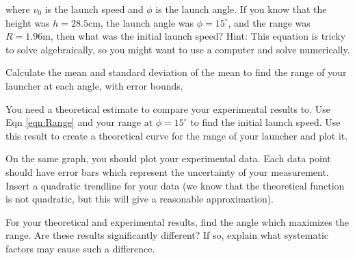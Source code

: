where $v_0$ is the launch speed and $\phi$ is the launch angle.  If you know that the height was $h=28.5$cm, the launch angle was $\phi=15^\circ$, and the range was $R=1.96$m, then what was the initial launch speed? Hint: This equation is tricky to solve algebraically, so you might want to use a computer and solve numerically.

\analysis

Calculate the mean and standard deviation of the mean to find the range of your launcher at each angle, with error bounds.

You need a theoretical estimate to compare your experimental results to. Use Eqn \ref{eqn:Range} and your range at $\phi=15^\circ$ to find the initial launch speed.  Use this result to create a theoretical curve for the range of your launcher and plot it.

On the same graph, you should plot your experimental data. Each data point should have error bars which represent the uncertainty of your measurement. Insert a quadratic trendline for your data (we know that the theoretical function is not quadratic, but this will give a reasonable approximation).

For your theoretical and experimental results, find the angle which maximizes the range.  Are these results significantly different? If so, explain what systematic factors may cause such a difference.
